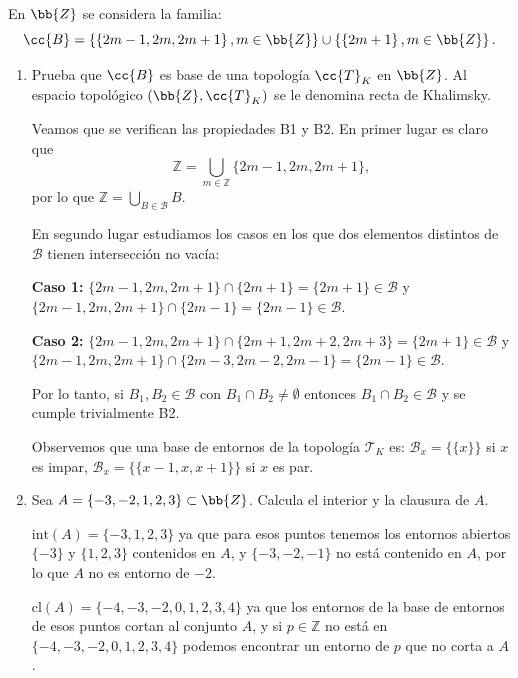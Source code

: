 \documentclass[12pt]{article}
\begin{document}
        \begin{ejercicio}
        En $\bb{Z}$ se considera la familia:
        \[
        \cc{B} = \left\{\left\{2m - 1, 2m, 2m + 1\right\}, m \in \bb{Z}\right\} \cup \left\{\left\{2m + 1\right\}, m \in \bb{Z}\right\}.
        \]
        \begin{enumerate}[label=\alph*)]
            \item Prueba que $\cc{B}$ es base de una topología $\cc{T}_K$ en $\bb{Z}$. Al espacio topológico $(\bb{Z}, \cc{T}_K)$ se le denomina recta de Khalimsky.

                Veamos que se verifican las propiedades B1 y B2. En primer lugar es claro que
                \[
                \mathbb{Z} = \bigcup_{m \in \mathbb{Z}} \{2m-1, 2m, 2m+1\},
                \]
                por lo que $\mathbb{Z} = \bigcup_{B \in \mathcal{B}} B$.
                
                En segundo lugar estudiamos los casos en los que dos elementos distintos de $\mathcal{B}$ tienen intersección no vacía:
                
                \textbf{Caso 1:} $\{2m-1, 2m, 2m+1\} \cap \{2m+1\} = \{2m+1\} \in \mathcal{B}$ y $\{2m-1, 2m, 2m+1\} \cap \{2m-1\} = \{2m-1\} \in \mathcal{B}$.
                
                \textbf{Caso 2:} $\{2m-1, 2m, 2m+1\} \cap \{2m+1, 2m+2, 2m+3\} = \{2m+1\} \in \mathcal{B}$ y $\{2m-1, 2m, 2m+1\} \cap \{2m-3, 2m-2, 2m-1\} = \{2m-1\} \in \mathcal{B}$.
                
                Por lo tanto, si $B_1, B_2 \in \mathcal{B}$ con $B_1 \cap B_2 \neq \emptyset$ entonces $B_1 \cap B_2 \in \mathcal{B}$ y se cumple trivialmente B2.
                
                Observemos que una base de entornos de la topología $\mathcal{T}_K$ es: $\mathcal{B}_x = \{\{x\}\}$ si $x$ es impar, $\mathcal{B}_x = \{\{x-1, x, x+1\}\}$ si $x$ es par.
        
            \item Sea $A = \{-3, -2, 1, 2, 3\} \subset \bb{Z}$. Calcula el interior y la clausura de $A$.
            
                $\text{int}(A) = \{-3, 1, 2, 3\}$ ya que para esos puntos tenemos los entornos abiertos $\{-3\}$ y $\{1, 2, 3\}$ contenidos en $A$, y $\{-3, -2, -1\}$ no está contenido en $A$, por lo que $A$ no es entorno de $-2$.
                
                $\text{cl}(A) = \{-4, -3, -2, 0, 1, 2, 3, 4\}$ ya que los entornos de la base de entornos de esos puntos cortan al conjunto $A$, y si $p \in \mathbb{Z}$ no está en $\{-4, -3, -2, 0, 1, 2, 3, 4\}$ podemos encontrar un entorno de $p$ que no corta a $A$.


\end{enumerate}
\end{ejercicio}
\end{document}
